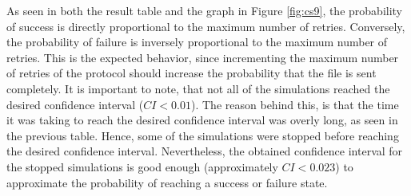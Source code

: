 As seen in both the result table and the graph in Figure \ref{fig:cs9}, the probability of success is directly proportional to the maximum number of retries. Conversely, the probability of failure is inversely proportional to the maximum number of retries. This is the expected behavior, since incrementing the maximum number of retries of the protocol should increase the probability that the file is sent completely. It is important to note, that not all of the simulations reached the desired confidence interval ($CI < 0.01$). The reason behind this, is that the time it  was taking to reach the desired confidence interval was overly long, as seen in the previous table. Hence, some of the simulations were stopped before reaching the desired confidence interval. Nevertheless, the obtained confidence interval for the stopped simulations is good enough (approximately $CI < 0.023$) to approximate the probability of reaching a success or failure state.

